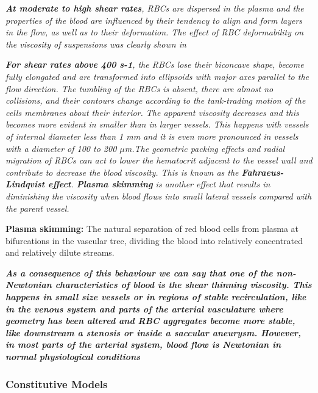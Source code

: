 \documentclass[11pt,letterpaper]{article}
\begin{document}
\textit{\textbf{{\color{blue}At moderate to high shear rates}}, RBCs are dispersed in the plasma and the properties of the blood
are influenced by their tendency to align and form layers in the flow, as well as to their deformation. The effect of RBC deformability on the viscosity of suspensions was clearly shown in}

\textit{\textbf{{\color{blue}For shear rates above 400 s-1}}, the RBCs lose their biconcave shape, become fully elongated and are transformed into ellipsoids with major axes parallel to the flow direction. The tumbling of the RBCs is absent, there are almost no collisions, and their contours change according to the tank-trading motion of the cells membranes about their interior. The apparent viscosity decreases and this becomes more evident in smaller than in larger vessels. This happens with vessels of internal diameter less than 1 mm and it is even more pronounced in vessels with a diameter of 100 to 200 $\mu$m.The geometric packing effects and radial migration of RBCs can act to lower the hematocrit adjacent to the vessel wall and contribute to decrease the blood viscosity. This is known as the \textbf{Fahraeus-Lindqvist effect}. \textbf{Plasma skimming} is another effect that results in diminishing the viscosity when blood flows into small lateral vessels compared with the parent vessel.}

\textbf{Plasma skimming:} The natural separation of red blood cells from plasma at bifurcations in the vascular tree, dividing the blood into relatively concentrated and relatively dilute streams.

\textbf{\textit{As a consequence of this behaviour we can say that one of the non-Newtonian characteristics of blood
is the shear thinning viscosity. This happens in small size vessels or in regions of stable recirculation, like in the venous system and parts of the arterial vasculature where geometry has been altered and RBC aggregates become more stable, like downstream a stenosis or inside a saccular aneurysm. However, in most parts of the arterial system, blood flow is Newtonian in normal physiological conditions}}

\subsubsection*{Constitutive Models}
\end{document}
